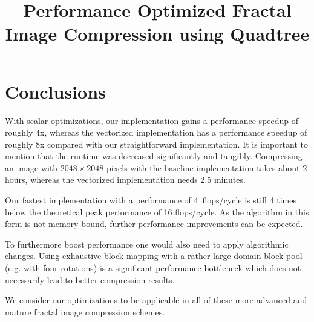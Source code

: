 \documentclass[letterpaper]{article}
\title{Performance Optimized Fractal Image Compression using Quadtree}
\begin{document}
\section{Conclusions}

With scalar optimizations, our implementation gains a performance speedup
of roughly 4x, whereas the vectorized implementation has a performance speedup
of roughly 8x compared with our straightforward implementation. It is important
to mention that the runtime was decreased significantly and tangibly. Compressing
an image with $2048 \times 2048$ pixels with the baseline implementation takes
about 2 hours, whereas the vectorized implementation needs 2.5 minutes.

Our fastest implementation with a performance of 4~flops/cycle is still 4 times
below the theoretical peak performance of 16 flops/cycle. As the algorithm in
this form is not memory bound, further performance improvements can be expected.

To furthermore boost performance one would also need to apply algorithmic changes.
Using exhaustive block mapping with a rather large
domain block pool (e.g. with four rotations) is a significant performance
bottleneck which does not necessarily lead to better compression results.

We consider our optimizations to be applicable in all of these more advanced
and mature fractal image compression schemes.

\end{document}
